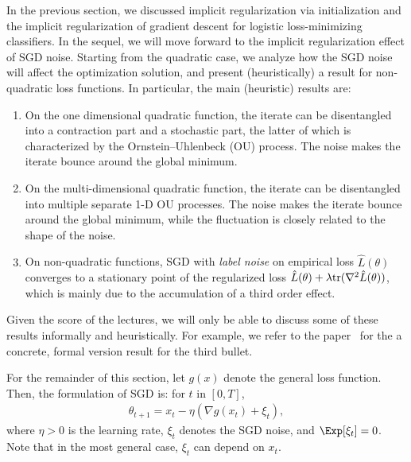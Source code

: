 In the previous section, we discussed implicit regularization via initialization and the implicit regularization of gradient descent for logistic loss-minimizing classifiers. 
In the sequel, we will move forward to the implicit regularization effect of SGD noise. Starting from the quadratic case, we analyze how the SGD noise will affect the optimization solution, and present (heuristically) a result for non-quadratic loss functions. In particular, the main (heuristic) results are:
\begin{enumerate}
\item On the one dimensional quadratic function, the iterate can be disentangled into a contraction part and a stochastic part, the latter of which is characterized by the Ornstein–Uhlenbeck (OU) process. The noise makes the iterate bounce around the global minimum.
\item On the multi-dimensional quadratic function, the iterate can be disentangled into multiple separate 1-D OU processes. The noise makes the iterate bounce around the global minimum, while the fluctuation is closely related to the shape of the noise.
\item On non-quadratic functions, SGD with \textit{label noise} on empirical loss $\hat{L}(\theta)$ converges to a stationary point of the regularized loss $\hat{L}(\theta) + \lambda \textup{tr}(\nabla^2\hat{L}(\theta))$, which is mainly due to the accumulation of a third order effect. 
\end{enumerate}
 
Given the score of the lectures,  we will only be able to discuss some of these results informally and heuristically. For example, we refer to the paper~\citet{damian2021label} for the a concrete, formal version result for the third bullet. 

For the remainder of this section, let $g(x)$ denote the general loss function. Then, the formulation of SGD is: for $t$ in $[0,T]$,
\begin{align}
\theta_{t+1} = x_{t} - \eta(\nabla g(x_{t}) + \xi_t),
\end{align} 
where $\eta > 0$ is the learning rate, $\xi_t$ denotes the SGD noise, and $\Exp[\xi_t] = 0$. Note that in the most general case, $\xi_t$ can depend on $x_t$.
	
